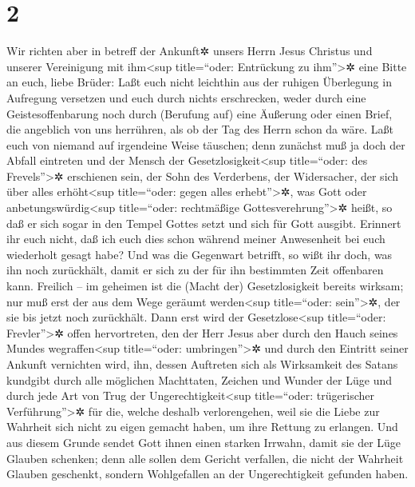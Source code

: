 \hypertarget{section-1}{%
\section{2}\label{section-1}}

 Wir richten aber in betreff der Ankunft✲ unsers Herrn
Jesus Christus und unserer Vereinigung mit ihm\textless sup
title=``oder: Entrückung zu ihm''\textgreater✲ eine Bitte an euch, liebe
Brüder:  Laßt euch nicht leichthin aus der ruhigen
Überlegung in Aufregung versetzen und euch durch nichts erschrecken,
weder durch eine Geistesoffenbarung noch durch (Berufung auf) eine
Äußerung oder einen Brief, die angeblich von uns herrühren, als ob der
Tag des Herrn schon da wäre.  Laßt euch von niemand auf
irgendeine Weise täuschen; denn zunächst muß ja doch der Abfall
eintreten und der Mensch der Gesetzlosigkeit\textless sup title=``oder:
des Frevels''\textgreater✲ erschienen sein, der Sohn des Verderbens,
 der Widersacher, der sich über alles erhöht\textless sup
title=``oder: gegen alles erhebt''\textgreater✲, was Gott oder
anbetungswürdig\textless sup title=``oder: rechtmäßige
Gottesverehrung''\textgreater✲ heißt, so daß er sich sogar in den Tempel
Gottes setzt und sich für Gott ausgibt.  Erinnert ihr euch
nicht, daß ich euch dies schon während meiner Anwesenheit bei euch
wiederholt gesagt habe?  Und was die Gegenwart betrifft,
so wißt ihr doch, was ihn noch zurückhält, damit er sich zu der für ihn
bestimmten Zeit offenbaren kann.  Freilich -- im geheimen
ist die (Macht der) Gesetzlosigkeit bereits wirksam; nur muß erst der
aus dem Wege geräumt werden\textless sup title=``oder:
sein''\textgreater✲, der sie bis jetzt noch zurückhält. 
Dann erst wird der Gesetzlose\textless sup title=``oder:
Frevler''\textgreater✲ offen hervortreten, den der Herr Jesus aber durch
den Hauch seines Mundes wegraffen\textless sup title=``oder:
umbringen''\textgreater✲ und durch den Eintritt seiner Ankunft
vernichten wird,  ihn, dessen Auftreten sich als
Wirksamkeit des Satans kundgibt durch alle möglichen Machttaten, Zeichen
und Wunder der Lüge  und durch jede Art von Trug der
Ungerechtigkeit\textless sup title=``oder: trügerischer
Verführung''\textgreater✲ für die, welche deshalb verlorengehen, weil
sie die Liebe zur Wahrheit sich nicht zu eigen gemacht haben, um ihre
Rettung zu erlangen.  Und aus diesem Grunde sendet Gott
ihnen einen starken Irrwahn, damit sie der Lüge Glauben schenken;
 denn alle sollen dem Gericht verfallen, die nicht der
Wahrheit Glauben geschenkt, sondern Wohlgefallen an der Ungerechtigkeit
gefunden haben.

